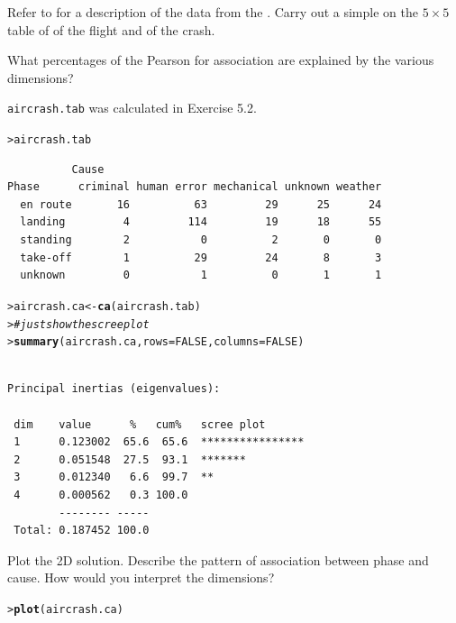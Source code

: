 \documentclass[10pt]{report}\usepackage[]{graphicx}\usepackage[]{color}
\makeatletter
\newcommand{\hlnum}[1]{\textcolor[rgb]{0.686,0.059,0.569}{#1}}%
\newcommand{\hlcom}[1]{\textcolor[rgb]{0.678,0.584,0.686}{\textit{#1}}}%
\newcommand{\hlstd}[1]{\textcolor[rgb]{0.345,0.345,0.345}{#1}}%
\newcommand{\hlkwb}[1]{\textcolor[rgb]{0.69,0.353,0.396}{#1}}%
\newcommand{\hlkwc}[1]{\textcolor[rgb]{0.333,0.667,0.333}{#1}}%
\newcommand{\hlkwd}[1]{\textcolor[rgb]{0.737,0.353,0.396}{\textbf{#1}}}%
\newenvironment{kframe}{%
 \def\at@end@of@kframe{}%
 \ifinner\ifhmode%
  \def\at@end@of@kframe{\end{minipage}}%
  \begin{minipage}{\columnwidth}%
 \fi\fi%
 \def\FrameCommand##1{\hskip\@totalleftmargin \hskip-\fboxsep
 \colorbox{shadecolor}{##1}\hskip-\fboxsep
     \hskip-\linewidth \hskip-\@totalleftmargin \hskip\columnwidth}%
 \MakeFramed {\advance\hsize-\width
   \@totalleftmargin\z@ \linewidth\hsize
   \@setminipage}}%
 {\par\unskip\endMakeFramed%
 \at@end@of@kframe}
\newenvironment{knitrout}{}{} %
\renewenvironment{knitrout}{\small\renewcommand{\baselinestretch}{.85}}{} %
\makeatother
\begin{document}
\begin{Exercises}
  \exercise\label{lab:ca-crash} Refer to  for a description of the  data from the .
  Carry out a simple \ca on the $5 \times 5$ table of  of the flight and  of the crash.
  \begin{enumerate*}
    \item What percentages of the Pearson \chisq for association are explained
    by the various dimensions?
    \begin{ans}
\texttt{aircrash.tab} was calculated in Exercise 5.2.
\begin{knitrout}\footnotesize
{}\color{fgcolor}\begin{kframe}
\begin{alltt}
\hlstd{> }\hlstd{aircrash.tab}
\end{alltt}
\begin{verbatim}
          Cause
Phase      criminal human error mechanical unknown weather
  en route       16          63         29      25      24
  landing         4         114         19      18      55
  standing        2           0          2       0       0
  take-off        1          29         24       8       3
  unknown         0           1          0       1       1
\end{verbatim}
\begin{alltt}
\hlstd{> }\hlstd{aircrash.ca} \hlkwb{<-} \hlkwd{ca}\hlstd{(aircrash.tab)}
\hlstd{> }     \hlcom{# just show the scree plot}
\hlstd{> }\hlkwd{summary}\hlstd{(aircrash.ca,} \hlkwc{rows}\hlstd{=}\hlnum{FALSE}\hlstd{,} \hlkwc{columns}\hlstd{=}\hlnum{FALSE}\hlstd{)}
\end{alltt}
\begin{verbatim}

Principal inertias (eigenvalues):

 dim    value      %   cum%   scree plot               
 1      0.123002  65.6  65.6  ****************         
 2      0.051548  27.5  93.1  *******                  
 3      0.012340   6.6  99.7  **                       
 4      0.000562   0.3 100.0                           
        -------- -----                                 
 Total: 0.187452 100.0                                 
\end{verbatim}
\end{kframe}
\end{knitrout}
    \end{ans}
    
    \item Plot the 2D \ca solution. Describe the pattern of association between
    phase and cause.  How would you interpret the dimensions?
    \begin{ans}
\begin{knitrout}\footnotesize
{}\color{fgcolor}\begin{kframe}
\begin{alltt}
\hlstd{> }\hlkwd{plot}\hlstd{(aircrash.ca)}
\end{alltt}
\end{kframe}


\end{knitrout}
\end{ans}
\end{enumerate*}
\end{Exercises}
\end{document}

